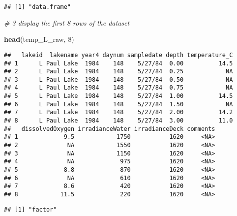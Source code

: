 \documentclass[]{article}
\newenvironment{Shaded}{\begin{snugshade}}{\end{snugshade}}
\newcommand{\KeywordTok}[1]{\textcolor[rgb]{0.13,0.29,0.53}{\textbf{#1}}}
\newcommand{\DecValTok}[1]{\textcolor[rgb]{0.00,0.00,0.81}{#1}}
\newcommand{\CommentTok}[1]{\textcolor[rgb]{0.56,0.35,0.01}{\textit{#1}}}
\newcommand{\OperatorTok}[1]{\textcolor[rgb]{0.81,0.36,0.00}{\textbf{#1}}}
\newcommand{\NormalTok}[1]{#1}
\begin{document}
\begin{verbatim}
## [1] "data.frame"
\end{verbatim}

\begin{Shaded}
\begin{Highlighting}[]
\CommentTok{# 3 display the first 8 rows of the dataset }

\KeywordTok{head}\NormalTok{(temp_L_raw, }\DecValTok{8}\NormalTok{)}
\end{Highlighting}
\end{Shaded}

\begin{verbatim}
##   lakeid  lakename year4 daynum sampledate depth temperature_C
## 1      L Paul Lake  1984    148    5/27/84  0.00          14.5
## 2      L Paul Lake  1984    148    5/27/84  0.25            NA
## 3      L Paul Lake  1984    148    5/27/84  0.50            NA
## 4      L Paul Lake  1984    148    5/27/84  0.75            NA
## 5      L Paul Lake  1984    148    5/27/84  1.00          14.5
## 6      L Paul Lake  1984    148    5/27/84  1.50            NA
## 7      L Paul Lake  1984    148    5/27/84  2.00          14.2
## 8      L Paul Lake  1984    148    5/27/84  3.00          11.0
##   dissolvedOxygen irradianceWater irradianceDeck comments
## 1             9.5            1750           1620     <NA>
## 2              NA            1550           1620     <NA>
## 3              NA            1150           1620     <NA>
## 4              NA             975           1620     <NA>
## 5             8.8             870           1620     <NA>
## 6              NA             610           1620     <NA>
## 7             8.6             420           1620     <NA>
## 8            11.5             220           1620     <NA>
\end{verbatim}

\begin{Shaded}
\end{Shaded}

\begin{verbatim}
## [1] "factor"
\end{verbatim}

\begin{Shaded}
\end{Shaded}
\end{document}
